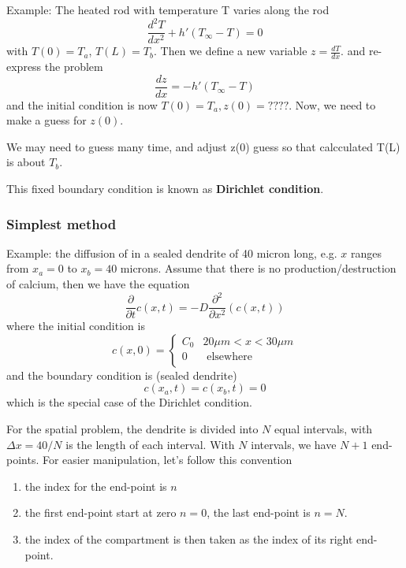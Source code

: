 Example: The heated rod with temperature T varies along the rod
\begin{equation}
\frac{d^2T}{dx^2} + h'(T_\infty - T) = 0
\end{equation}
with $T(0)=T_a$, $T(L)=T_b$. Then we define a new variable $z=\frac{dT}{dx}$.
and re-express the problem
\begin{equation}
\frac{dz}{dx} = -h'(T_\infty-T)
\end{equation}
and the initial condition is now $T(0) = T_a, z(0)= ????$. Now, we need to make
a guess for $z(0)$. 

We may need to guess many time, and adjust z(0) guess so that calcculated T(L)
is about $T_b$. 

This fixed boundary condition is known as {\bf Dirichlet condition}.

\subsubsection{Simplest method}
\label{sec:simplest-method}


Example: the diffusion of  in a sealed dendrite of 40 micron
long, e.g.  $x$ ranges from $x_a=0$ to $x_b=40$ microns. Assume that there is no
production/destruction of calcium, then we have the equation
\begin{equation}
  \label{eq:809}
  \frac{\partial}{\partial t} c(x,t) = - D\frac{\partial^2}{\partial x^2} 
  \left(
    c(x,t) \right)   
\end{equation}
where the initial condition is
\begin{equation}
  \label{eq:810}
  c(x,0) = \left\{
    \begin{array}{lc}
      C_0 & 20 \mu m < x < 30 \mu m \\
      0  & \text{ elsewhere } \\
    \end{array}
    \right.
\end{equation}
and the boundary condition is (sealed dendrite)
\begin{equation}
  \label{eq:811}
  c(x_a,t) = c(x_b,t) = 0
\end{equation}
which is the special case of the Dirichlet condition.


For the spatial problem, the dendrite is divided into $N$ equal
intervals, with $\Delta x=40/N$ is the length of each interval. With
$N$ intervals, we have $N+1$ end-points. For easier manipulation,
let's follow this convention
\begin{enumerate}
\item the index for the end-point is $n$
\item the first end-point start at zero $n=0$, the last end-point is
  $n=N$.
\item the index of the compartment is then taken as the index of its
  right end-point.  
\end{enumerate}

